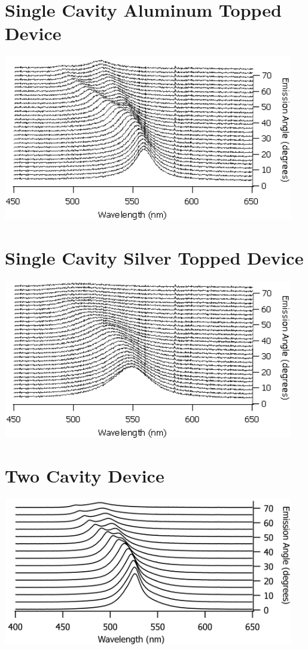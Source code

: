 \documentclass{report}
\begin{document}
    \section*{Single Cavity Aluminum Topped Device}
    \begin{center}
    \includegraphics[width=0.95\textwidth]{images/n1_al_top_waterfall.png}
    \end{center}
    
    \section*{Single Cavity Silver Topped Device}
    \begin{center}
    \includegraphics[width=0.95\textwidth]{images/n1_ag_top_waterfall.png}
    \end{center}
    
    \section*{Two Cavity Device}
    \begin{center}
    \includegraphics[width=0.95\textwidth]{images/n2_waterfall.png}
    \end{center}
    
\end{document}
